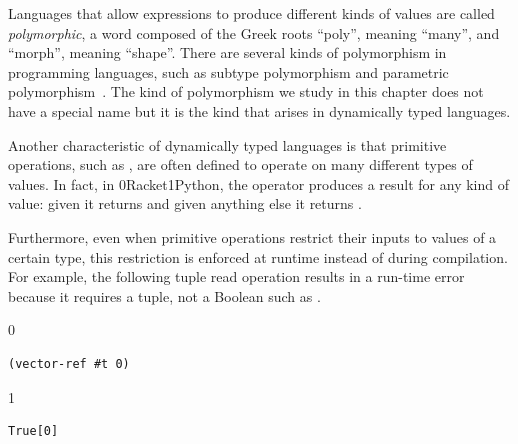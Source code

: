 \documentclass[7x10,nocrop]{TimesAPriori_MIT}%
\def\racketEd{0}
\def\pythonEd{1}
\def\edition{1}
\newcommand{\racket}[1]{{\if\edition\racketEd{#1}\fi}}
\newcommand{\python}[1]{{\if\edition\pythonEd #1\fi}}
\begin{document}
Languages that allow expressions to produce different kinds of values
are called \emph{polymorphic}, a word composed of the Greek roots
``poly'', meaning ``many'', and ``morph'', meaning ``shape''.  There
are several kinds of polymorphism in programming languages, such as
subtype polymorphism and parametric
polymorphism~\citep{Cardelli:1985kx}. The kind of polymorphism we
study in this chapter does not have a special name but it is the kind
that arises in dynamically typed languages.

Another characteristic of dynamically typed languages is that
primitive operations, such as , are often defined to operate
on many different types of values.  In fact, in
\racket{Racket}\python{Python}, the  operator produces a
result for any kind of value: given \FALSE{} it returns \TRUE{} and
given anything else it returns \FALSE{}.

Furthermore, even when primitive operations restrict their inputs to
values of a certain type, this restriction is enforced at runtime
instead of during compilation. For example, the following tuple read
operation results in a run-time error because it requires a tuple, not
a Boolean such as \TRUE{}.
%
{\if\edition\racketEd
\begin{lstlisting}
(vector-ref #t 0)
\end{lstlisting}
\fi}
%
{\if\edition\pythonEd
\begin{lstlisting}
True[0]
\end{lstlisting}
\fi}
\end{document}
